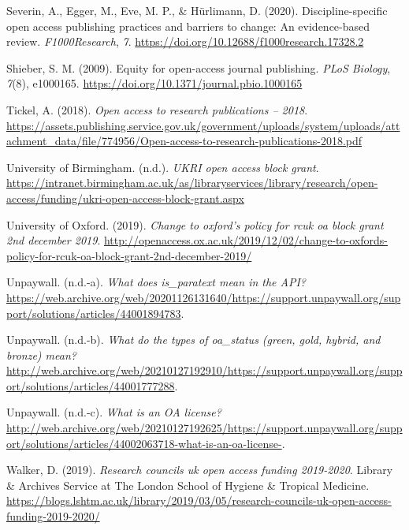 \documentclass[a4paper,man,floatsintext,longtable,noextraspace,12pt]{apa6}
\newlength{\cslhangindent}
\newenvironment{cslreferences}%
  {\setlength{\parindent}{0pt}%
  \everypar{\setlength{\hangindent}{\cslhangindent}}\ignorespaces}%
  {\par}
\begin{document}
\begin{cslreferences}
\leavevmode\hypertarget{ref-Severin_2020}{}%
Severin, A., Egger, M., Eve, M. P., \& Hürlimann, D. (2020).
Discipline-specific open access publishing practices and barriers to
change: An evidence-based review. \emph{F1000Research}, \emph{7}.
\url{https://doi.org/10.12688/f1000research.17328.2}

\leavevmode\hypertarget{ref-Shieber_2009}{}%
Shieber, S. M. (2009). Equity for open-access journal publishing.
\emph{PLoS Biology}, \emph{7}(8), e1000165.
\url{https://doi.org/10.1371/journal.pbio.1000165}

\leavevmode\hypertarget{ref-Tickel_2018}{}%
Tickel, A. (2018). \emph{Open access to research publications -- 2018}.
\url{https://assets.publishing.service.gov.uk/government/uploads/system/uploads/attachment_data/file/774956/Open-access-to-research-publications-2018.pdf}

\leavevmode\hypertarget{ref-birmingham}{}%
University of Birmingham. (n.d.). \emph{UKRI open access block grant}.
\url{https://intranet.birmingham.ac.uk/as/libraryservices/library/research/open-access/funding/ukri-open-access-block-grant.aspx}

\leavevmode\hypertarget{ref-oxford_2019}{}%
University of Oxford. (2019). \emph{Change to oxford's policy for rcuk
oa block grant 2nd december 2019}.
\url{http://openaccess.ox.ac.uk/2019/12/02/change-to-oxfords-policy-for-rcuk-oa-block-grant-2nd-december-2019/}

\leavevmode\hypertarget{ref-Unpaywall_para}{}%
Unpaywall. (n.d.-a). \emph{What does is\_paratext mean in the API?}
\url{https://web.archive.org/web/20201126131640/https://support.unpaywall.org/support/solutions/articles/44001894783}.

\leavevmode\hypertarget{ref-Unpaywall_types}{}%
Unpaywall. (n.d.-b). \emph{What do the types of oa\_status (green, gold,
hybrid, and bronze) mean?}
\url{http://web.archive.org/web/20210127192910/https://support.unpaywall.org/support/solutions/articles/44001777288}.

\leavevmode\hypertarget{ref-Unpaywall_oa_license}{}%
Unpaywall. (n.d.-c). \emph{What is an OA license?}
\url{http://web.archive.org/web/20210127192625/https://support.unpaywall.org/support/solutions/articles/44002063718-what-is-an-oa-license-}.

\leavevmode\hypertarget{ref-walker_2019}{}%
Walker, D. (2019). \emph{Research councils uk open access funding
2019-2020}. Library \& Archives Service at The London School of Hygiene
\& Tropical Medicine.
\url{https://blogs.lshtm.ac.uk/library/2019/03/05/research-councils-uk-open-access-funding-2019-2020/}


\end{cslreferences}
\end{document}
